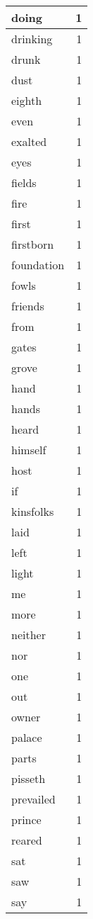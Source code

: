 \begin{center}
\begin{longtable}{l|r}
doing & 1 \\ \hline
drinking & 1 \\ \hline
drunk & 1 \\ \hline
dust & 1 \\ \hline
eighth & 1 \\ \hline
even & 1 \\ \hline
exalted & 1 \\ \hline
eyes & 1 \\ \hline
fields & 1 \\ \hline
fire & 1 \\ \hline
first & 1 \\ \hline
firstborn & 1 \\ \hline
foundation & 1 \\ \hline
fowls & 1 \\ \hline
friends & 1 \\ \hline
from & 1 \\ \hline
gates & 1 \\ \hline
grove & 1 \\ \hline
hand & 1 \\ \hline
hands & 1 \\ \hline
heard & 1 \\ \hline
himself & 1 \\ \hline
host & 1 \\ \hline
if & 1 \\ \hline
kinsfolks & 1 \\ \hline
laid & 1 \\ \hline
left & 1 \\ \hline
light & 1 \\ \hline
me & 1 \\ \hline
more & 1 \\ \hline
neither & 1 \\ \hline
nor & 1 \\ \hline
one & 1 \\ \hline
out & 1 \\ \hline
owner & 1 \\ \hline
palace & 1 \\ \hline
parts & 1 \\ \hline
pisseth & 1 \\ \hline
prevailed & 1 \\ \hline
prince & 1 \\ \hline
reared & 1 \\ \hline
sat & 1 \\ \hline
saw & 1 \\ \hline
say & 1 \\ \hline

\end{longtable}
\end{center}
